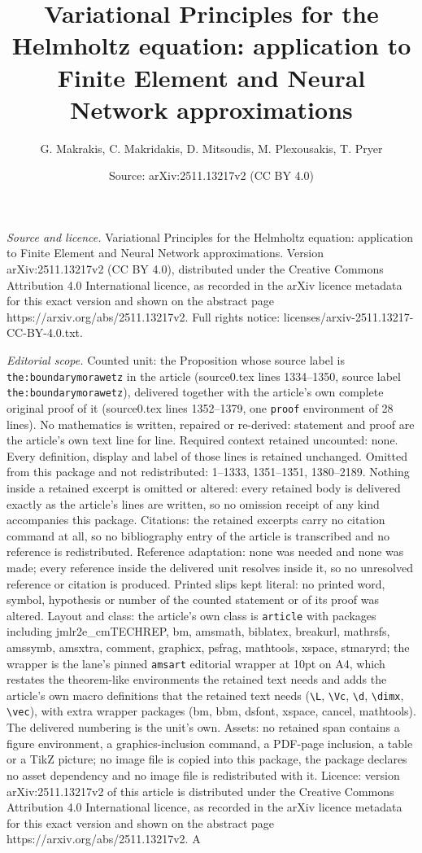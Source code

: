 \documentclass[10pt,a4paper]{amsart}
\title[Variational Principles for the Helmholtz equation: applicati]{Variational Principles for the Helmholtz equation: application to Finite Element and Neural Network approximations}
\author{G. Makrakis, C. Makridakis, D. Mitsoudis, M. Plexousakis, T. Pryer}
\date{Source: arXiv:2511.13217v2 (CC BY 4.0)}
\begin{document}
\maketitle

\noindent\emph{Source and licence.} Variational Principles for the Helmholtz equation: application to Finite Element and Neural Network approximations. Version arXiv:2511.13217v2 (CC BY 4.0), distributed under the Creative Commons Attribution 4.0 International licence, as recorded in the arXiv licence metadata for this exact version and shown on the abstract page https://arxiv.org/abs/2511.13217v2. Full rights notice: licenses/arxiv-2511.13217-CC-BY-4.0.txt.\par\smallskip

\noindent\textit{Editorial scope.} Counted unit: the Proposition whose source label is \texttt{the:boundarymorawetz} in the article (source0.tex lines 1334--1350, source label \texttt{the:boundarymorawetz}), delivered together with the article's own complete original proof of it (source0.tex lines 1352--1379, one \texttt{proof} environment of 28 lines). No mathematics is written, repaired or re-derived: statement and proof are the article's own text line for line. Required context retained uncounted: none. Every definition, display and label of those lines is retained unchanged. Omitted from this package and not redistributed: 1--1333, 1351--1351, 1380--2189. Nothing inside a retained excerpt is omitted or altered: every retained body is delivered exactly as the article's lines are written, so no omission receipt of any kind accompanies this package. Citations: the retained excerpts carry no citation command at all, so no bibliography entry of the article is transcribed and no reference is redistributed. Reference adaptation: none was needed and none was made; every reference inside the delivered unit resolves inside it, so no unresolved reference or citation is produced. Printed slips kept literal: no printed word, symbol, hypothesis or number of the counted statement or of its proof was altered. Layout and class: the article's own class is \texttt{article} with packages including jmlr2e\_cmTECHREP, bm, amsmath, biblatex, breakurl, mathrsfs, amssymb, amsxtra, comment, graphicx, psfrag, mathtools, xspace, stmaryrd; the wrapper is the lane's pinned \texttt{amsart} editorial wrapper at 10pt on A4, which restates the theorem-like environments the retained text needs and adds the article's own macro definitions that the retained text needs (\texttt{\textbackslash L}, \texttt{\textbackslash Vc}, \texttt{\textbackslash d}, \texttt{\textbackslash dimx}, \texttt{\textbackslash vec}), with extra wrapper packages (bm, bbm, dsfont, xspace, cancel, mathtools). The delivered numbering is the unit's own. Assets: no retained span contains a figure environment, a graphics-inclusion command, a PDF-page inclusion, a table or a TikZ picture; no image file is copied into this package, the package declares no asset dependency and no image file is redistributed with it. Licence: version arXiv:2511.13217v2 of this article is distributed under the Creative Commons Attribution 4.0 International licence, as recorded in the arXiv licence metadata for this exact version and shown on the abstract page https://arxiv.org/abs/2511.13217v2. A 
\end{document}
